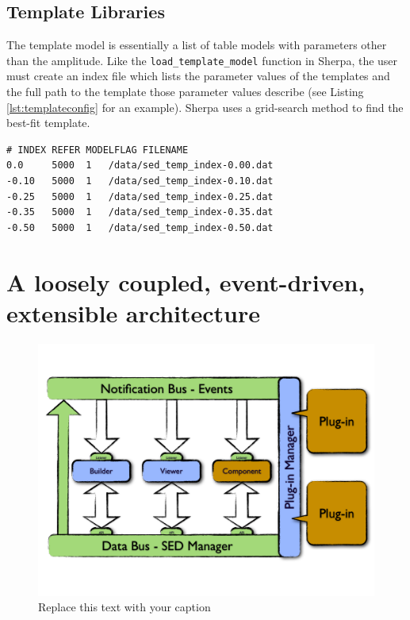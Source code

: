 \documentclass[5p]{elsarticle}
\begin{document}
\subsection{Template Libraries}
The template model is essentially a list of table models with parameters other than the amplitude. Like the \texttt{load\_template\_model} function in Sherpa, the user must create an index file which lists the parameter values of the templates and the full path to the template those parameter values describe (see Listing \ref{lst:templateconfig} for an example). Sherpa uses a grid-search method to find the best-fit template.


\begin{lstlisting}[style=code, caption=Caption, label=lst:templateconfig]
# INDEX REFER MODELFLAG FILENAME
0.0     5000  1   /data/sed_temp_index-0.00.dat
-0.10   5000  1   /data/sed_temp_index-0.10.dat
-0.25   5000  1   /data/sed_temp_index-0.25.dat
-0.35   5000  1   /data/sed_temp_index-0.35.dat
-0.50   5000  1   /data/sed_temp_index-0.50.dat
\end{lstlisting}


\section{A loosely coupled, event-driven, extensible architecture}
\label{sec:architecture}

\begin{figure}
\begin{center}
\includegraphics[width=\columnwidth]{figures/IrisDiagrams.1.png}
\caption{Replace this text with your caption}
\end{center}
\end{figure}
\end{document}

